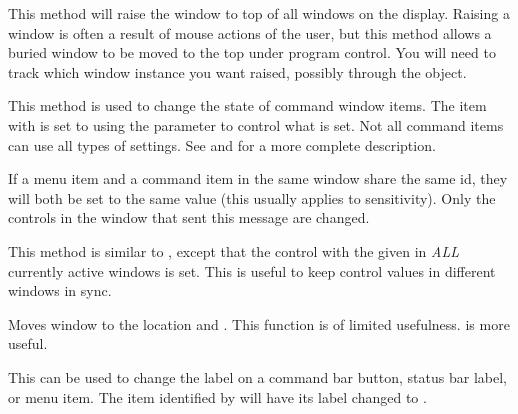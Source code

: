 
This method will raise the window to top of all windows on the
display.  Raising a window is often a result of mouse actions of
the user, but this method allows a buried window to be moved to
the top under program control. You will need to track which
window instance you want raised, possibly through the 
object.


This method is used to change the state of command window items.
The item with  is set to  using the
 parameter to control what is set. Not all
command items can use all types of settings. See 
and  for a more complete description.

If a menu item and a command item in the same window share the
same id, they will both be set to the same value (this usually
applies to sensitivity). Only the controls in the window that
sent this message are changed.


This method is similar to , except that
the control with the given  in \emph{ALL} currently
active windows is set. This is useful to keep control values
in different windows in sync.


Moves  window to the location  and
. This function is of limited usefulness.
 is more useful.


This can be used to change the label on a command bar button,
status bar label, or menu item. The item identified by 
will have its label changed to .

